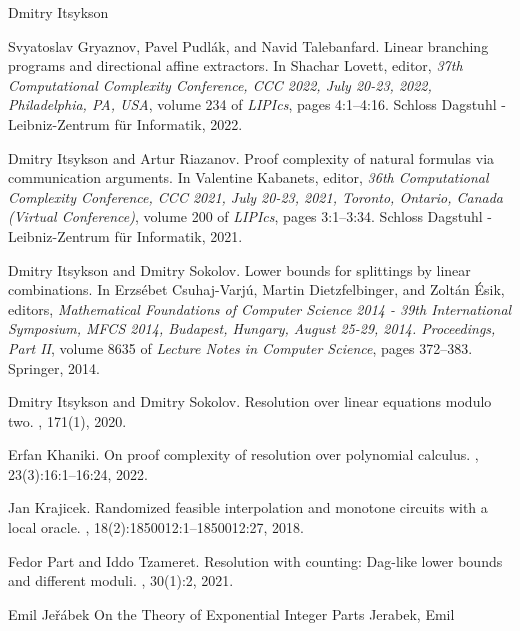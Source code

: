 \documentclass[report]{owrart}
\begin{document}
\begin{report}
\begin{talk}{Dmitry Itsykson}
\begin{thebibliography}{99}
Svyatoslav Gryaznov, Pavel Pudl{\'{a}}k, and Navid Talebanfard.
\newblock Linear branching programs and directional affine extractors.
\newblock In Shachar Lovett, editor, {\em 37th Computational Complexity
  Conference, {CCC} 2022, July 20-23, 2022, Philadelphia, PA, {USA}}, volume
  234 of {\em LIPIcs}, pages 4:1--4:16. Schloss Dagstuhl - Leibniz-Zentrum
  f{\"{u}}r Informatik, 2022.

Dmitry Itsykson and Artur Riazanov.
\newblock Proof complexity of natural formulas via communication arguments.
\newblock In Valentine Kabanets, editor, {\em 36th Computational Complexity
  Conference, {CCC} 2021, July 20-23, 2021, Toronto, Ontario, Canada (Virtual
  Conference)}, volume 200 of {\em LIPIcs}, pages 3:1--3:34. Schloss Dagstuhl -
  Leibniz-Zentrum f{\"{u}}r Informatik, 2021.

Dmitry Itsykson and Dmitry Sokolov.
\newblock Lower bounds for splittings by linear combinations.
\newblock In Erzs{\'{e}}bet Csuhaj{-}Varj{\'{u}}, Martin Dietzfelbinger, and
  Zolt{\'{a}}n {\'{E}}sik, editors, {\em Mathematical Foundations of Computer
  Science 2014 - 39th International Symposium, {MFCS} 2014, Budapest, Hungary,
  August 25-29, 2014. Proceedings, Part {II}}, volume 8635 of {\em Lecture
  Notes in Computer Science}, pages 372--383. Springer, 2014.

Dmitry Itsykson and Dmitry Sokolov.
\newblock Resolution over linear equations modulo two.
, 171(1), 2020.

Erfan Khaniki.
\newblock On proof complexity of resolution over polynomial calculus.
, 23(3):16:1--16:24, 2022.

Jan Krajicek.
\newblock Randomized feasible interpolation and monotone circuits with a local
  oracle.
, 18(2):1850012:1--1850012:27, 2018.

Fedor Part and Iddo Tzameret.
\newblock Resolution with counting: Dag-like lower bounds and different moduli.
, 30(1):2, 2021.
  
      
      \end{thebibliography}
      
      \end{talk}
  


\begin{talk}{Emil Je\v r\'abek}
  {On the Theory of Exponential Integer Parts}
  {Jerabek, Emil}
  

\end{talk}
\end{report}
\end{document}
